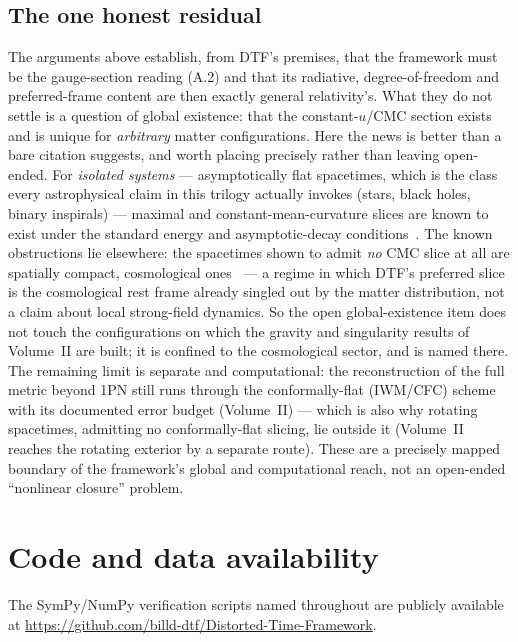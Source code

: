 \documentclass[11pt]{article}
\begin{document}
\subsection*{The one honest residual}
The arguments above establish, from DTF's premises, that the framework must be the gauge-section reading
(A.2) and that its radiative, degree-of-freedom and preferred-frame content are then exactly general
relativity's. What they do not settle is a question of global existence: that the constant-$u$/CMC section
exists and is unique for \emph{arbitrary} matter configurations. Here the news is better than a bare
citation suggests, and worth placing precisely rather than leaving open-ended. For \emph{isolated systems}
--- asymptotically flat spacetimes, which is the class every astrophysical claim in this trilogy actually
invokes (stars, black holes, binary inspirals) --- maximal and constant-mean-curvature slices are known to
exist under the standard energy and asymptotic-decay conditions~\cite{Bartnik1984,MarsdenTipler1980,Gerhardt1983}.
The known obstructions lie elsewhere: the spacetimes shown to admit \emph{no} CMC slice at all are
spatially compact, cosmological ones~\cite{Bartnik1988} --- a regime in which DTF's preferred slice is the
cosmological rest frame already singled out by the matter distribution, not a claim about local strong-field
dynamics. So the open global-existence item does not touch the configurations on which the gravity and
singularity results of Volume~II are built; it is confined to the cosmological sector, and is named there.
The remaining limit is separate and computational: the reconstruction of the full metric beyond 1PN still
runs through the conformally-flat (IWM/CFC) scheme with its documented error budget (Volume~II) --- which is
also why rotating spacetimes, admitting no conformally-flat slicing, lie outside it (Volume~II reaches the
rotating exterior by a separate route). These are a precisely mapped boundary of the framework's global and
computational reach, not an open-ended ``nonlinear closure'' problem.

\section*{Code and data availability}
{\small The SymPy/NumPy verification scripts named throughout are publicly available at
\url{https://github.com/billd-dtf/Distorted-Time-Framework}.\par}
\end{document}
